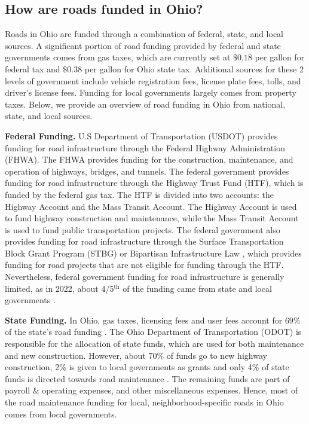 \subsection{How are roads funded in Ohio?}

Roads in Ohio are funded through a combination of federal, state, and local sources. A significant portion of road funding provided by federal and state governments comes from gas taxes, which are currently set at $\$0.18$ per gallon for federal tax and $\$0.38$ per gallon for Ohio state tax. Additional sources for these 2 levels of government include vehicle registration fees, license plate fees, tolls, and driver's license fees. Funding for local governments largely comes from property taxes. Below, we provide an overview of road funding in Ohio from national, state, and local sources.

{\bf Federal Funding.} U.S Department of Transportation (USDOT) provides funding for road infrastructure through the Federal Highway Administration (FHWA). The FHWA provides funding for the construction, maintenance, and operation of highways, bridges, and tunnels. The federal government provides funding for road infrastructure through the Highway Trust Fund (HTF), which is funded by the federal gas tax. The HTF is divided into two accounts: the Highway Account and the Mass Transit Account. The Highway Account is used to fund highway construction and maintenance, while the Mass Transit Account is used to fund public transportation projects. The federal government also provides funding for road infrastructure through the Surface Transportation Block Grant Program (STBG) or Bipartisan Infrastructure Law \citep{USDOT_BIL_Ohio}, which provides funding for road projects that are not eligible for funding through the HTF. Nevertheless, federal government funding for road infrastructure is generally limited, as in 2022, about 4/5$^\text{th}$ of the funding came from state and local governments \citep{pgpf_htf_explained}.

{\bf State Funding.}
In Ohio, gas taxes, licensing fees and user fees account for $69\%$ of the state's road funding \citep{boesen2021}. The Ohio Department of Transportation (ODOT) is responsible for the allocation of state funds, which are used for both maintenance and new construction. However, about 70\% of funds go to new highway construction, 2\% is given to local governments as grants and only 4\% of state funds is directed towards road maintenance \citep{odot2023}. The remaining funds are part of payroll \& operating expenses, and other miscellaneous expenses. Hence, most of the road maintenance funding for local, neighborhood-specific roads in Ohio comes from local governments.



